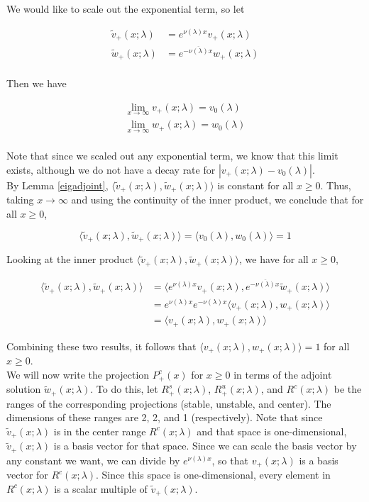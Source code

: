 \documentclass[12pt]{article}
\begin{document}
We would like to scale out the exponential term, so let

\begin{align*}
\tilde{v}_+(x; \lambda) &= e^{\nu(\lambda) x } v_+(x; \lambda) \\
\tilde{w}_+(x; \lambda) &= e^{-\overline{\nu(\lambda)} x } w_+(x; \lambda) \\
\end{align*}

Then we have

\begin{align*}
\lim_{x \rightarrow \infty} v_+(x; \lambda) = v_0(\lambda) \\
\lim_{x \rightarrow \infty} w_+(x; \lambda) = w_0(\lambda) \\
\end{align*}

Note that since we scaled out any exponential term, we know that this limit exists, although we do not have a decay rate for $|v_+(x; \lambda) - v_0(\lambda)|$.\\

By Lemma \ref{eigadjoint}, $\langle \tilde{v}_+(x; \lambda), \tilde{w}_+(x; \lambda) \rangle$ is constant for all $x \geq 0$. Thus, taking $x \rightarrow \infty$ and using the continuity of the inner product, we conclude that for all $x \geq 0$,

\[
\langle \tilde{v}_+(x; \lambda), \tilde{w}_+(x; \lambda) \rangle = \langle v_0(\lambda), w_0(\lambda) \rangle = 1
\]

Looking at the inner product $\langle \tilde{v}_+(x; \lambda), \tilde{w}_+(x; \lambda) \rangle$, we have for all $x \geq 0$,

\begin{align*}
\langle \tilde{v}_+(x; \lambda), \tilde{w}_+(x; \lambda) \rangle
&= \langle e^{\nu(\lambda) x } v_+(x; \lambda), e^{-\overline{\nu(\lambda)} x} \tilde{w}_+(x; \lambda) \rangle \\
&= e^{\nu(\lambda) x } e^{-\nu(\lambda) x } \langle v_+(x; \lambda), w_+(x; \lambda) \rangle \\
&= \langle v_+(x; \lambda), w_+(x; \lambda) \rangle
\end{align*}

Combining these two results, it follows that $\langle v_+(x; \lambda), w_+(x; \lambda) \rangle = 1$ for all $x \geq 0$.\\

We will now write the projection $P^c_+(x)$ for $x \geq 0$ in terms of the adjoint solution $\tilde{w}_+(x; \lambda)$. To do this, let $R^s_+(x; \lambda)$, $R^u_+(x; \lambda)$, and $R^c(x; \lambda)$ be the ranges of the corresponding projections (stable, unstable, and center). The dimensions of these ranges are 2, 2, and 1 (respectively). Note that since $\tilde{v}_+(x; \lambda)$ is in the center range $R^c(x; \lambda)$ and that space is one-dimensional, $\tilde{v}_+(x; \lambda)$ is a basis vector for that space. Since we can scale the basis vector by any constant we want, we can divide by $e^{\nu(\lambda) x}$, so that $v_+(x; \lambda)$ is a basis vector for $R^c(x; \lambda)$. Since this space is one-dimensional, every element in $R^c(x; \lambda)$ is a scalar multiple of $\tilde{v}_+(x; \lambda)$. \\
\end{document}
